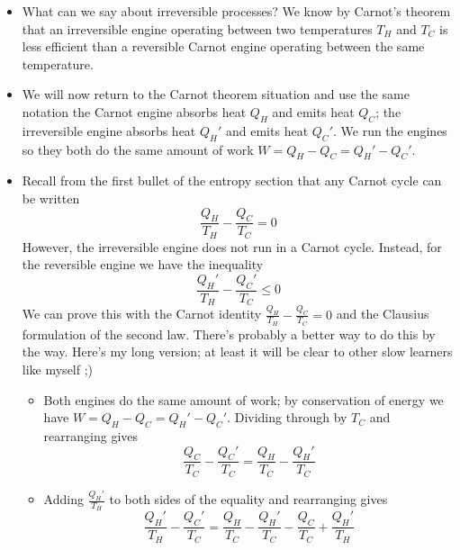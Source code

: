 \documentclass[11pt, a4paper]{article}
\begin{document}
\begin{itemize}
	\item What can we say about irreversible processes? We know by Carnot's theorem that an irreversible engine operating between two temperatures $ T_{H} $ and $ T_{C} $ is less efficient than a reversible Carnot engine operating between the same temperature.
	
	\item We will now return to the Carnot theorem situation and use the same notation the Carnot engine absorbs heat $ Q_{H} $ and emits heat $ Q_{C} $; the irreversible engine absorbs heat $ Q_{H}' $ and emits heat $ Q_{C}' $. We run the engines so they both do the same amount of work $ W = Q_{H} - Q_{C} = Q_{H}' - Q_{C}' $. 
	
	\item Recall from the first bullet of the entropy section that any Carnot cycle can be written
	\begin{equation*}
		\frac{Q_{H}}{T_{H}} - \frac{Q_{C}}{T_{C}} = 0
	\end{equation*}
	However, the irreversible engine does not run in a Carnot cycle. Instead, for the reversible engine we have the inequality
	\begin{equation*}
		\frac{Q_{H}'}{T_{H}} - \frac{Q_{C}'}{T_{C}} \leq 0
	\end{equation*}
	We can prove this with the Carnot identity $ \frac{Q_{H}}{T_{H}} - \frac{Q_{C}}{T_{C}} = 0 $ and the Clausius formulation of the second law. There's probably a better way to do this by the way. Here's my long version; at least it will be clear to other slow learners like myself ;)
	\begin{itemize}
		\item Both engines do the same amount of work; by conservation of energy we have $ W = Q_{H} - Q_{C} = Q_{H}' - Q_{C}' $. Dividing through by $ T_{C} $ and rearranging gives
		\begin{equation*}
			\frac{Q_{C}}{T_{C}} - \frac{Q_{C}'}{T_{C}} = \frac{Q_{H}}{T_{C}} - \frac{Q_{H}'}{T_{C}}
		\end{equation*}
		
		\item Adding $ \frac{Q_{H}'}{T_{H}} $ to both sides of the equality and rearranging gives
		\begin{equation*}
			\frac{Q_{H}'}{T_{H}} - \frac{Q_{C}'}{T_{C}} = \frac{Q_{H}}{T_{C}} - \frac{Q_{H}'}{T_{C}} - \frac{Q_{C}}{T_{C}} + \frac{Q_{H}'}{T_{H}}
		\end{equation*}
		

\end{itemize}
\end{itemize}
\end{document}
